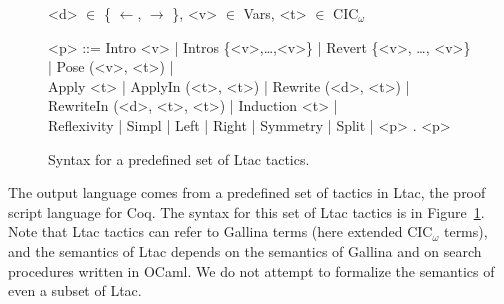 \begin{figure}
\small
\begin{grammar}
<d> $\in$ \{ $\leftarrow$, $\rightarrow$ \}, <v> $\in$ Vars, <t> $\in$ CIC$_{\omega}$

<p> ::= Intro <v> | Intros \{<v>,\ldots,<v>\} | Revert \{<v>, \ldots, <v>\} | Pose (<v>, <t>) | \\
Apply <t> | ApplyIn (<t>, <t>) | Rewrite (<d>, <t>) | RewriteIn (<d>, <t>, <t>) | Induction <t> |  \\
Reflexivity | Simpl | Left | Right | Symmetry | Split | <p> . <p>
\end{grammar}
\caption{Syntax for a predefined set of Ltac tactics.}
\label{fig:ltacsyntax}
\end{figure}

The output language comes from a predefined set of tactics in Ltac, the proof script language for Coq.
The syntax for this set of Ltac tactics is in Figure~\ref{fig:ltacsyntax}.
Note that Ltac tactics can refer to Gallina terms (here extended CIC$_{\omega}$ terms),
and the semantics of Ltac depends on the semantics of Gallina and on search procedures written in OCaml.
We do not attempt to formalize the semantics of even a subset of Ltac.

